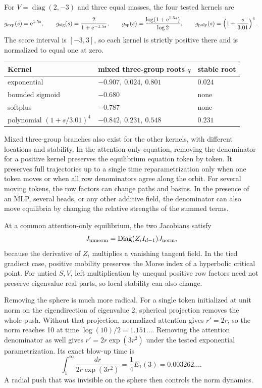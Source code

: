\documentclass[11pt,a4paper]{article}
\theoremstyle{definition}
\newcommand{\e}{\mathrm e}
\begin{document}
For $V=\operatorname{diag}(2,-3)$ and three equal masses, the four tested kernels are
\[
 g_{\exp}(s)=\e^{1.5s},\qquad
 g_{\rm sig}(s)=\frac{2}{1+\e^{-1.5s}},\qquad
 g_{\rm sp}(s)=\frac{\log(1+\e^{1.5s})}{\log 2},\qquad
 g_{\rm poly}(s)=\left(1+\frac{s}{3.01}\right)^4.
\]
The score interval is $[-3,3]$, so each kernel is strictly positive there and is
normalized to equal one at zero.
\begin{center}
\begin{tabularx}{0.88\textwidth}{YYl}
\toprule
Kernel & mixed three-group roots $q$ & stable root \\
\midrule
exponential & $-0.907,\ 0.024,\ 0.801$ & $0.024$ \\
bounded sigmoid & $-0.680$ & none \\
softplus & $-0.787$ & none \\
polynomial $(1+s/3.01)^4$ & $-0.842,\ 0.231,\ 0.548$ & $0.231$ \\
\bottomrule
\end{tabularx}
\end{center}

Mixed three-group branches also exist for the other kernels, with different locations and
stability.  In the attention-only equation, removing the denominator for a positive
kernel preserves the equilibrium equation token by token.  It preserves full
trajectories up to a single time reparametrization only when one token moves or when
all row denominators agree along the orbit.  For several moving tokens, the row
factors can change paths and basins.  In the presence of an MLP, several heads, or any
other additive field, the denominator can also move equilibria by changing the
relative strengths of the summed terms.

At a common attention-only equilibrium, the two Jacobians satisfy
\[
 J_{\rm unnorm}=\operatorname{Diag}(Z_i I_{d-1})J_{\rm norm},
\]
because the derivative of $Z_i$ multiplies a vanishing tangent field.  In the tied
gradient case, positive mobility preserves the Morse index of a hyperbolic critical
point.  For untied $S,V$, left multiplication by unequal positive row factors need
not preserve eigenvalue real parts, so local stability can also change.

Removing the sphere is much more radical.  For a single token initialized at unit norm
on the eigendirection of eigenvalue 2, spherical projection removes the whole push.
Without that projection, normalized attention gives $r'=2r$, so the norm reaches 10
at time $\log(10)/2=1.151\ldots$.  Removing the attention denominator as well gives
$r'=2r\exp(3r^2)$ under the tested exponential parametrization.  Its exact blow-up
time is
\[
 \int_1^\infty\frac{dr}{2r\exp(3r^2)}=\frac14 E_1(3)
 =0.003262\ldots .
\]
A radial push that was invisible on the sphere then controls the norm dynamics.
\end{document}
